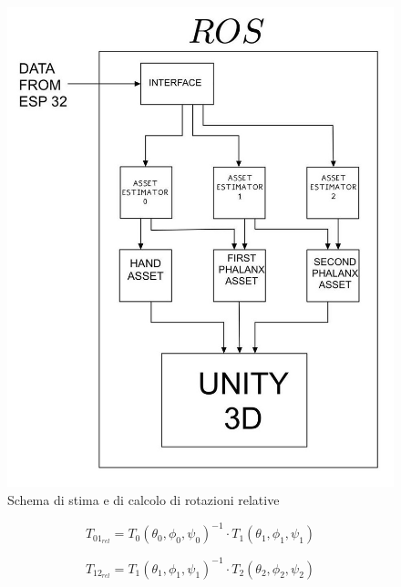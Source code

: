 \begin{figure}[H]
    \includegraphics[scale=0.2]{immagini/unity.jpg}
    \centering
    \caption{Schema di stima e di calcolo di rotazioni relative}
\end{figure}

\begin{equation}
    T_{01_{rel}} = T_0(\theta_0,\phi_0,\psi_0)^{-1} \cdot T_1(\theta_1,\phi_1,\psi_1)
    \label{slerp}
\end{equation}

\begin{equation}
    T_{12_{rel}} = T_1(\theta_1,\phi_1,\psi_1)^{-1} \cdot T_2(\theta_2,\phi_2,\psi_2)
    \label{slerp}
\end{equation}\\

